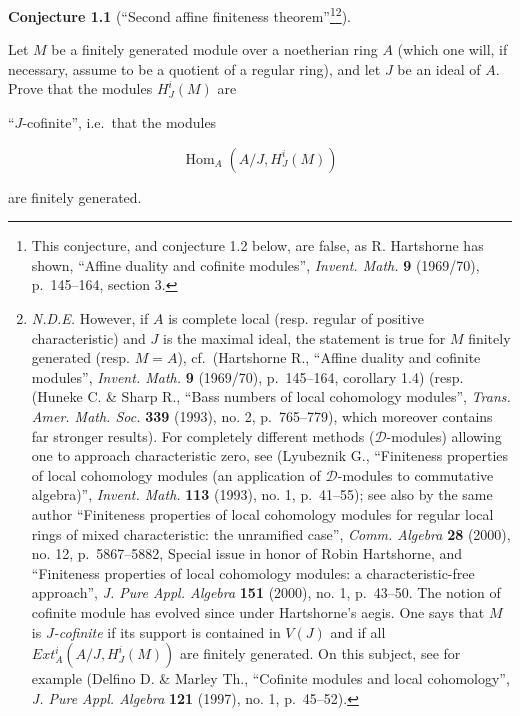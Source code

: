 \documentclass[
  11pt,
  a4paper,
]{book}
\begin{document}
\textbf{Conjecture 1.1} (``Second affine finiteness
theorem''\footnote{This conjecture, and conjecture 1.2 below, are false,
  as R. Hartshorne has shown, ``Affine duality and cofinite modules'',
  \emph{Invent. Math.} \textbf{9} (1969/70), p.~145--164, section 3.}\footnote{\emph{N.D.E.}
  However, if \(A\) is complete local (resp. regular of positive
  characteristic) and \(J\) is the maximal ideal, the statement is true
  for \(M\) finitely generated (resp. \(M = A\)), cf.~(Hartshorne R.,
  ``Affine duality and cofinite modules'', \emph{Invent. Math.}
  \textbf{9} (1969/70), p.~145--164, corollary 1.4) (resp. (Huneke C. \&
  Sharp R., ``Bass numbers of local cohomology modules'', \emph{Trans.
  Amer. Math. Soc.} \textbf{339} (1993), no. 2, p.~765--779), which
  moreover contains far stronger results). For completely different
  methods (\(\mathcal{D}\)-modules) allowing one to approach
  characteristic zero, see (Lyubeznik G., ``Finiteness properties of
  local cohomology modules (an application of \(\mathcal{D}\)-modules to
  commutative algebra)'', \emph{Invent. Math.} \textbf{113} (1993), no.
  1, p.~41--55); see also by the same author ``Finiteness properties of
  local cohomology modules for regular local rings of mixed
  characteristic: the unramified case'', \emph{Comm. Algebra}
  \textbf{28} (2000), no. 12, p.~5867--5882, Special issue in honor of
  Robin Hartshorne, and ``Finiteness properties of local cohomology
  modules: a characteristic-free approach'', \emph{J. Pure Appl.
  Algebra} \textbf{151} (2000), no. 1, p.~43--50. The notion of cofinite
  module has evolved since under Hartshorne's aegis. One says that \(M\)
  is \emph{\(J\)-cofinite} if its support is contained in \(V(J)\) and
  if all \(Ext^{i}_{A}(A/J, H^{i}_{J}(M))\) are finitely generated. On
  this subject, see for example (Delfino D. \& Marley Th., ``Cofinite
  modules and local cohomology'', \emph{J. Pure Appl. Algebra}
  \textbf{121} (1997), no. 1, p.~45--52).}).

Let \(M\) be a finitely generated module over a noetherian ring \(A\)
(which one will, if necessary, assume to be a quotient of a regular
ring), and let \(J\) be an ideal of \(A\). Prove that the modules
\(H^{i}_{J}(M)\) are

``\(J\)-cofinite'', i.e.~that the modules

\[ \operatorname{Hom}_{A}(A/J, H^{i}_{J}(M)) \]

are finitely generated.
\end{document}
